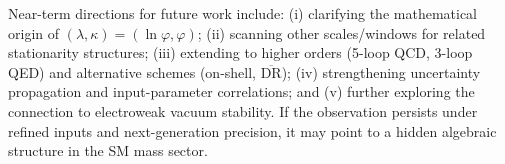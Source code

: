 \documentclass[aps,prd,onecolumn,amsmath,amssymb,superscriptaddress,nofootinbib,showpacs,showkeys]{revtex4-2}
\begin{document}
Near-term directions for future work include: (i) clarifying the mathematical origin of $(\lambda,\kappa)=(\ln\varphi,\varphi)$; (ii) scanning other scales/windows for related stationarity structures; (iii) extending to higher orders (5-loop QCD, 3-loop QED) and alternative schemes (on-shell, $\overline{\mathrm{DR}}$); (iv) strengthening uncertainty propagation and input-parameter correlations; and (v) further exploring the connection to electroweak vacuum stability. If the observation persists under refined inputs and next-generation precision, it may point to a hidden algebraic structure in the SM mass sector.


\end{document}
